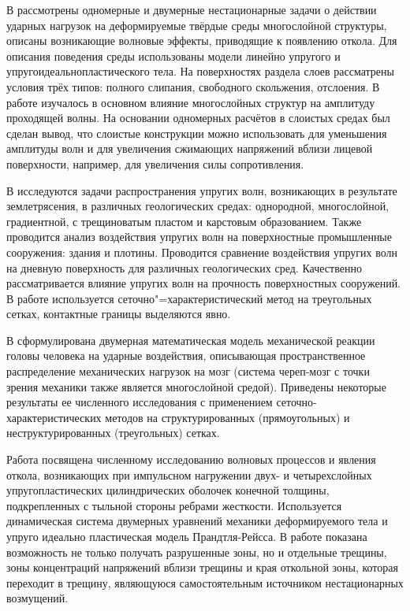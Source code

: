 В \cite{petrov_tormasov_holodov} рассмотрены одномерные и двумерные нестационарные задачи о действии ударных нагрузок на деформируемые твёрдые среды многослойной структуры, описаны возникающие волновые эффекты, приводящие к появлению откола. Для описания поведения среды использованы модели линейно упругого и упругоидеальнопластического тела. На поверхностях раздела слоев рассматрены условия трёх типов: полного слипания, свободного скольжения, отслоения. В работе изучалось в основном влияние многослойных структур на амплитуду проходящей волны. На основании одномерных расчётов в слоистых средах был сделан вывод, что слоистые конструкции можно использовать для уменьшения амплитуды волн и для увеличения сжимающих напряжений вблизи лицевой поверхности, например, для увеличения силы сопротивления.

В \cite{golubev_kvasov_petrov} исследуются задачи распространения упругих волн, возникающих в результате землетрясения, в различных геологических средах: однородной, многослойной, градиентной, с трещиноватым пластом и карстовым образованием. Также проводится анализ воздействия упругих волн на поверхностные промышленные сооружения: здания и плотины. Проводится сравнение воздействия упругих волн на дневную поверхность для различных геологических сред. Качественно рассматривается влияние упругих волн на прочность поверхностных сооружений. В работе используется сеточно"=характеристический метод на треугольных сетках, контактные границы выделяются явно.

В \cite{agapov_belocerkovsky_petrov} сформулирована двумерная математическая модель механической реакции головы человека на ударные воздействия, описывающая пространственное распределение механических нагрузок на мозг (система череп-мозг с точки зрения механики также является многослойной средой). Приведены некоторые результаты ее численного исследования с применением сеточно-характеристических методов на структурированных (прямоугольных) и неструктурированных (треугольных) сетках.

Работа \cite{petrov} посвящена численному исследованию волновых процессов и явления откола, возникающих при импульсном нагружении двух- и четырехслойных упругопластических цилиндрических оболочек конечной толщины, подкрепленных с тыльной стороны ребрами жесткости. Используется динамическая система двумерных уравнений механики деформируемого тела и упруго идеально пластическая модель Прандтля-Рейсса. В работе показана возможность не только получать разрушенные зоны, но и отдельные трещины, зоны концентраций напряжений вблизи трещины и края откольной зоны, которая переходит в трещину, являющуюся самостоятельным источником нестационарных возмущений.
